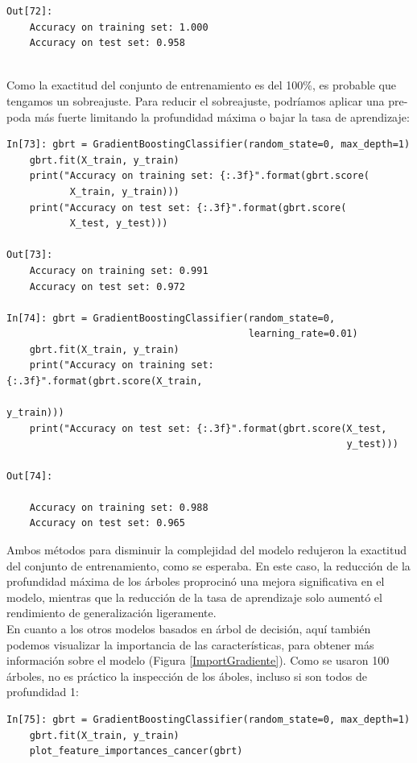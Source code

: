 {\begin{lstlisting}
Out[72]:
    Accuracy on training set: 1.000
    Accuracy on test set: 0.958
 
 \end{lstlisting}
Como la exactitud del conjunto de entrenamiento es del 100\%, es probable que tengamos un 
sobreajuste. Para reducir el sobreajuste, podríamos aplicar una pre-poda  más fuerte limitando la profundidad máxima o bajar la tasa de aprendizaje:\\


\begin{lstlisting}
In[73]: gbrt = GradientBoostingClassifier(random_state=0, max_depth=1)
	gbrt.fit(X_train, y_train)
	print("Accuracy on training set: {:.3f}".format(gbrt.score(
	       X_train, y_train)))
	print("Accuracy on test set: {:.3f}".format(gbrt.score(
	       X_test, y_test)))

Out[73]:
	Accuracy on training set: 0.991
	Accuracy on test set: 0.972

In[74]: gbrt = GradientBoostingClassifier(random_state=0, 
                                          learning_rate=0.01)
	gbrt.fit(X_train, y_train)
	print("Accuracy on training set: {:.3f}".format(gbrt.score(X_train,
	                                                           y_train)))
	print("Accuracy on test set: {:.3f}".format(gbrt.score(X_test,
	                                                       y_test)))

Out[74]:
	
	Accuracy on training set: 0.988
	Accuracy on test set: 0.965
\end{lstlisting}

Ambos métodos para disminuir la complejidad del modelo redujeron la exactitud del conjunto de
 entrenamiento, como se esperaba. En este caso, la reducción de la profundidad máxima de los
  árboles proprocinó una mejora  significativa en el modelo, mientras que la reducción de la tasa de 
 aprendizaje solo aumentó el rendimiento de generalización ligeramente. \\

En cuanto a los otros modelos basados en árbol de decisión, aquí también podemos visualizar la 
importancia de las características, para  obtener más información sobre el modelo 
(Figura \ref{ImportGradiente}). Como se usaron  100 árboles, no es práctico la inspección de los áboles, incluso  si son todos de profundidad 1:\\

\begin{lstlisting}
In[75]: gbrt = GradientBoostingClassifier(random_state=0, max_depth=1)
	gbrt.fit(X_train, y_train)
	plot_feature_importances_cancer(gbrt)
\end{lstlisting}

}
